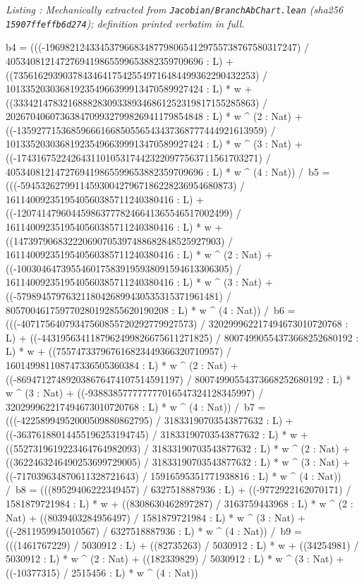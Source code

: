 \documentclass[a4paper,11pt]{article}
\newcounter{leanlisting}
\newenvironment{leanlisting}[2]{%
  \refstepcounter{leanlisting}\label{#2}%
  \begin{center}\textit{\small Listing \theleanlisting: #1}\end{center}%
  \Verbatim[breaklines=true,breakanywhere=true,fontsize=\footnotesize,frame=single,framesep=4pt,rulecolor=\color{gray!50},fillcolor=\color{gray!5}]%
}{%
  \endVerbatim%
}
\theoremstyle{plain}
\theoremstyle{definition}
\theoremstyle{remark}
\begin{document}
\begin{leanlisting}{Mechanically extracted from \texttt{Jacobian/BranchAbChart.lean} (sha256 \texttt{15907ffeffb6d274}); definition printed verbatim in full.}{ab:lst:def-chartclass}
      b4 = (((-196982124334537966834877980654129755738767580317247) / 4053408121472769419865599653882359709696 : L) + ((7356162939037843464175425549716484499362290432253) / 1013352030368192354966399913470589927424 : L) * w + ((3334214783216888283093389346861252319817155285863) / 2026704060736384709932799826941179854848 : L) * w ^ (2 : Nat) + ((-13592771536859666166850556543437368777444921613959) / 1013352030368192354966399913470589927424 : L) * w ^ (3 : Nat) + ((-1743167522426431101053174423220977563711561703271) / 4053408121472769419865599653882359709696 : L) * w ^ (4 : Nat)) /\
      b5 = (((-5945326279911459300427967186228236954680873) / 1611400923519540560385711240380416 : L) + ((-1207414796044598637778246641365546517002499) / 1611400923519540560385711240380416 : L) * w + ((147397906832220690705397488682848525927903) / 1611400923519540560385711240380416 : L) * w ^ (2 : Nat) + ((-1003046473955460175839195938091594613306305) / 1611400923519540560385711240380416 : L) * w ^ (3 : Nat) + ((-57989457976321180426899430535315371961481) / 805700461759770280192855620190208 : L) * w ^ (4 : Nat)) /\
      b6 = (((-40717564079347560855720292779927573) / 320299962217494673010720768 : L) + ((-4431956341187962499826675611271825) / 80074990554373668252680192 : L) * w + ((755747337967616823449366320710957) / 160149981108747336505360384 : L) * w ^ (2 : Nat) + ((-869471274892038676474107514591197) / 80074990554373668252680192 : L) * w ^ (3 : Nat) + ((-938838577777777016547324128345997) / 320299962217494673010720768 : L) * w ^ (4 : Nat)) /\
      b7 = (((-42258994952000509880862795) / 31833190703543877632 : L) + ((-36376188014455196253194745) / 31833190703543877632 : L) * w + ((5527319619223464764982093) / 31833190703543877632 : L) * w ^ (2 : Nat) + ((3622463246490253699729005) / 31833190703543877632 : L) * w ^ (3 : Nat) + ((-717039634870611328721643) / 15916595351771938816 : L) * w ^ (4 : Nat)) /\
      b8 = (((89529406222349457) / 6327518887936 : L) + ((-9772922162070171) / 1581879721984 : L) * w + ((8308630462897287) / 3163759443968 : L) * w ^ (2 : Nat) + ((8039403284956497) / 1581879721984 : L) * w ^ (3 : Nat) + ((-2811959945010567) / 6327518887936 : L) * w ^ (4 : Nat)) /\
      b9 = (((1461767229) / 5030912 : L) + ((82735263) / 5030912 : L) * w + ((34254981) / 5030912 : L) * w ^ (2 : Nat) + ((182339829) / 5030912 : L) * w ^ (3 : Nat) + ((-10377315) / 2515456 : L) * w ^ (4 : Nat))
\end{leanlisting}
\end{document}
